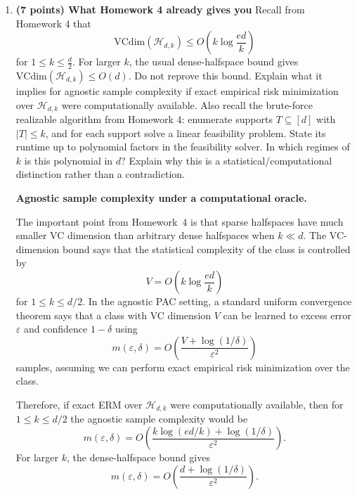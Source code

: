 \documentclass[11pt]{article}
\newcommand{\eps}{\varepsilon}
\newcommand{\VCdim}{\mathrm{VCdim}}
\begin{document}
\begin{enumerate}
    \item \textbf{(7 points) What Homework 4 already gives you}
    \newline
    Recall from Homework 4 that
    \[
    \VCdim(\mathcal{H}_{d,k}) \le O\!\left(k\log\frac{ed}{k}\right)
    \]
    for $1 \le k \le \frac{d}{2}$. For larger $k$, the usual dense-halfspace bound gives $\VCdim(\mathcal{H}_{d,k})\le O(d)$. Do not reprove this bound. Explain what it implies for agnostic sample complexity if exact empirical risk minimization over $\mathcal{H}_{d,k}$ were computationally available.
    \newline
    Also recall the brute-force realizable algorithm from Homework 4: enumerate supports $T\subseteq[d]$ with $|T|\le k$, and for each support solve a linear feasibility problem. State its runtime up to polynomial factors in the feasibility solver. In which regimes of $k$ is this polynomial in $d$? Explain why this is a statistical/computational distinction rather than a contradiction.

    \begin{solutionbox}
        \textbf{Agnostic sample complexity under a computational oracle.}

        The important point from Homework~4 is that sparse halfspaces have much smaller VC
        dimension than arbitrary dense halfspaces when $k \ll d$. The VC-dimension bound says
        that the statistical complexity of the class is controlled by
        \[
        V = O\!\left(k\log\frac{ed}{k}\right)
        \]
        for $1\le k\le d/2$. In the agnostic PAC setting, a standard uniform convergence theorem
        says that a class with VC dimension $V$ can be learned to excess error $\eps$ and confidence
        $1-\delta$ using
        \[
        m(\eps,\delta)
        =
        O\!\left(\frac{V+\log(1/\delta)}{\eps^2}\right)
        \]
        samples, assuming we can perform exact empirical risk minimization over the class.

        Therefore, if exact ERM over $\mathcal{H}_{d,k}$ were computationally available, then for
        $1\le k\le d/2$ the agnostic sample complexity would be
        \[
        \boxed{
        m(\eps,\delta)
        =
        O\!\left(
        \frac{k\log(ed/k)+\log(1/\delta)}{\eps^2}
        \right).
        }
        \]
        For larger $k$, the dense-halfspace bound gives
        \[
        \boxed{
        m(\eps,\delta)
        =
        O\!\left(
        \frac{d+\log(1/\delta)}{\eps^2}
        \right).
        }
        \]


\end{solutionbox}
\end{enumerate}
\end{document}
